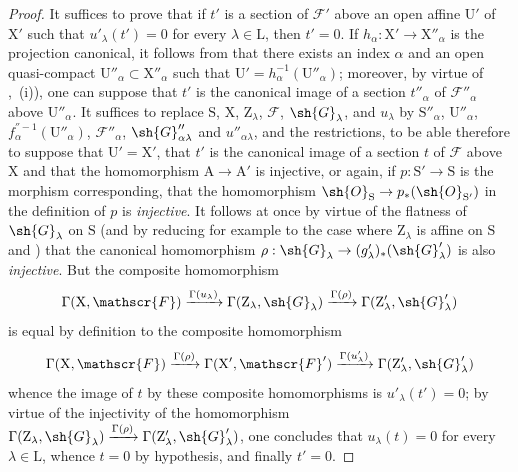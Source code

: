 \begin{proof}
It suffices to prove that if $t'$ is a section of $\mathscr{F}'$ above an open affine $\mathrm{U}'$ of $\mathrm{X}'$ such that $u'_\lambda(t')=0$ for every $\lambda\in\mathrm{L}$, then $t'=0$.
If $h_\alpha:\mathrm{X}'\to\mathrm{X}''_\alpha$ is the projection
canonical, it follows from  that there exists an index $\alpha$ and an open quasi-compact $\mathrm{U}''_\alpha\subset\mathrm{X}''_\alpha$ such that $\mathrm{U}'=h_\alpha^{-1}(\mathrm{U}''_\alpha)$; moreover, by virtue of ,~(i)), one can suppose that $t'$ is the canonical image of a section $t''_\alpha$ of $\mathscr{F}''_\alpha$ above $\mathrm{U}''_\alpha$.
It suffices to replace $\mathrm{S}$, $\mathrm{X}$, $\mathrm{Z}_\lambda$, $\mathscr{F}$, $\sh{G}_\lambda$, and $u_\lambda$ by $\mathrm{S}''_\alpha$, $\mathrm{U}''_\alpha$, $f_\alpha^{''-1}(\mathrm{U}''_\alpha)$, $\mathscr{F}''_\alpha$, $\sh{G}''_{\alpha\lambda}$ and $u''_{\alpha\lambda}$, and the restrictions, to be able therefore to suppose that $\mathrm{U}'=\mathrm{X}'$, that $t'$ is the canonical image of a section $t$ of $\mathscr{F}$ above $\mathrm{X}$ and that the homomorphism $\mathrm{A}\to\mathrm{A}'$ is injective, or again, if $p:\mathrm{S}'\to\mathrm{S}$ is the morphism corresponding, that the homomorphism $\sh{O}_\mathrm{S}\to p_*(\sh{O}_{\mathrm{S}'})$ in the definition of $p$ is \emph{injective}.
It follows at once by virtue of the flatness of $\sh{G}_\lambda$ on $\mathrm{S}$ (and by reducing for example to the case where $\mathrm{Z}_\lambda$ is affine on $\mathrm{S}$  and ) that the canonical homomorphism $\rho:\sh{G}_\lambda\to(g'_\lambda)_*(\sh{G}'_\lambda)$ is also \emph{injective}.
But the composite homomorphism
\[
  \Gamma(\mathrm{X},\mathscr{F})\xrightarrow{\Gamma(u_\lambda)}\Gamma(\mathrm{Z}_\lambda,\sh{G}_\lambda)\xrightarrow{\Gamma(\rho)}\Gamma(\mathrm{Z}'_\lambda,\sh{G}'_\lambda)
\]
is equal by definition to the composite homomorphism
\[
  \Gamma(\mathrm{X},\mathscr{F})\xrightarrow{\Gamma(\rho)}\Gamma(\mathrm{X}',\mathscr{F}')\xrightarrow{\Gamma(u'_\lambda)}\Gamma(\mathrm{Z}'_\lambda,\sh{G}'_\lambda)
\]
whence the image of $t$ by these composite homomorphisms is $u'_\lambda(t')=0$; by virtue of the injectivity of the homomorphism $\Gamma(\mathrm{Z}_\lambda,\sh{G}_\lambda)\xrightarrow{\Gamma(\rho)}\Gamma(\mathrm{Z}'_\lambda,\sh{G}'_\lambda)$, one concludes that $u_\lambda(t)=0$ for every $\lambda\in\mathrm{L}$, whence $t=0$ by hypothesis, and finally $t'=0$.
\end{proof}

